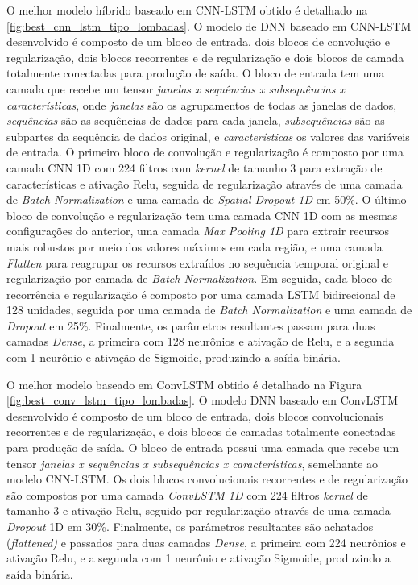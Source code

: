 O melhor modelo híbrido baseado em CNN-LSTM obtido é detalhado na \autoref{fig:best_cnn_lstm_tipo_lombadas}. O modelo de DNN baseado em CNN-LSTM desenvolvido é composto de um bloco de entrada, dois blocos de convolução e regularização, dois blocos recorrentes e de regularização e dois blocos de camada totalmente conectadas para produção de saída. O bloco de entrada tem uma camada que recebe um tensor \emph{janelas x sequências x subsequências x características}, onde \emph{janelas} são os agrupamentos de todas as janelas de dados, \emph{sequências} são as sequências de dados para cada janela, \emph{subsequências} são as subpartes da sequência de dados original, e \emph{características} os valores das variáveis de entrada. O primeiro bloco de convolução e regularização é composto por uma camada CNN 1D com 224 filtros com  \textit{kernel} de tamanho 3 para extração de características e ativação Relu, seguida de regularização através de uma camada de \textit{Batch Normalization} e uma camada de \textit{Spatial Dropout 1D} em 50\%. O último bloco de convolução e regularização tem uma camada CNN 1D com as mesmas configurações do anterior, uma camada \textit{Max Pooling 1D} para extrair recursos mais robustos por meio dos valores máximos em cada região, e uma camada \textit{Flatten} para reagrupar os recursos extraídos no sequência temporal original e regularização por camada de \textit{Batch Normalization}. Em seguida, cada bloco de recorrência e regularização é composto por uma camada LSTM bidirecional de 128 unidades, seguida por uma camada de \textit{Batch Normalization} e uma camada de \textit{Dropout} em 25\%. Finalmente, os parâmetros resultantes passam para duas camadas \textit{Dense}, a primeira com 128 neurônios e ativação de Relu, e a segunda com 1 neurônio e ativação de Sigmoide, produzindo a saída binária. 

O melhor modelo baseado em ConvLSTM obtido é detalhado na Figura \autoref{fig:best_conv_lstm_tipo_lombadas}. O modelo DNN baseado em ConvLSTM desenvolvido é composto de um bloco de entrada, dois blocos convolucionais recorrentes e de regularização, e dois blocos de camadas totalmente conectadas para produção de saída. O bloco de entrada possui uma camada que recebe um tensor \emph{janelas x sequências x subsequências x características}, semelhante ao modelo CNN-LSTM. Os dois blocos convolucionais recorrentes e de regularização são compostos por uma camada \textit{ConvLSTM 1D} com 224 filtros \textit{kernel} de tamanho 3 e ativação Relu, seguido por regularização através de uma camada \textit{Dropout} 1D em 30\%. Finalmente, os parâmetros resultantes são achatados (\textit{flattened)} e passados para duas camadas \textit{Dense}, a primeira com 224 neurônios e ativação Relu, e a segunda com 1 neurônio e ativação Sigmoide, produzindo a saída binária.

